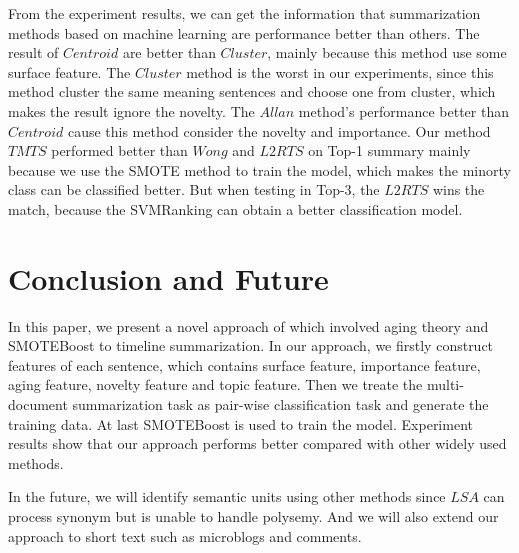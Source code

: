 \documentclass{llncs}
\begin{document}
From the experiment results, we can get the information that summarization methods based on machine learning are performance better than others. The result of $Centroid$ are better than $Cluster$, mainly because this method use some surface feature. The $Cluster$ method is the worst in our experiments, since this method cluster the same meaning sentences and choose one from cluster, which makes the result ignore the novelty. The $Allan$ method's performance better than $Centroid$ cause this method consider the novelty and importance. Our method $TMTS$ performed better than $Wong$ and $L2RTS$ on Top-1 summary mainly because we use the SMOTE method to train the model, which makes the minorty class can be classified better. But when testing in Top-3, the $L2RTS$ wins the match, because the SVMRanking can obtain a better classification model.

%
\section{Conclusion and Future}
%

In this paper, we present a novel approach of which involved aging theory and SMOTEBoost to timeline summarization. In our approach, we firstly construct features of each sentence, which contains surface feature, importance feature, aging feature, novelty feature and topic feature. Then we treate the multi-document summarization task as pair-wise classification task and generate the training data. At last SMOTEBoost is used to train the model. Experiment results show that our approach performs better compared with other widely used methods.

In the future, we will identify semantic units using other methods since $LSA$ can process synonym but is unable to handle polysemy. And we will also extend our approach to short text such as microblogs and comments.






\end{document}
